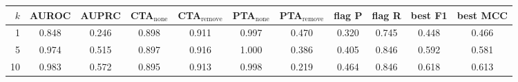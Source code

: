 \begin{tabular}{rcccccccccc}
\toprule
$k$ & AUROC & AUPRC & CTA$_\text{none}$ & CTA$_\text{remove}$ & PTA$_\text{none}$ & PTA$_\text{remove}$ & flag P & flag R & best F1 & best MCC \\
\midrule
1 & 0.848 & 0.246 & 0.898 & 0.911 & 0.997 & 0.470 & 0.320 & 0.745 & 0.448 & 0.466 \\
5 & 0.974 & 0.515 & 0.897 & 0.916 & 1.000 & 0.386 & 0.405 & 0.846 & 0.592 & 0.581 \\
10 & 0.983 & 0.572 & 0.895 & 0.913 & 0.998 & 0.219 & 0.464 & 0.846 & 0.618 & 0.613 \\
\bottomrule
\end{tabular}
